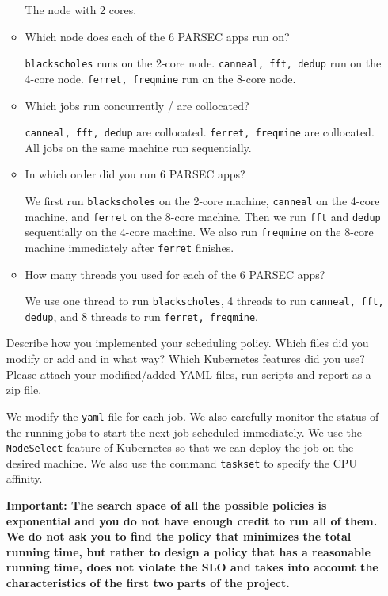 \documentclass[11pt]{article}
\begin{document}
\begin{enumerate}
\begin{itemize}
        The node with 2 cores.
        
        \item	Which node does each of the 6 PARSEC apps run on?
        
        \texttt{blackscholes} runs on the 2-core node. \texttt{canneal, fft, dedup} run on the 4-core node.
        \texttt{ferret, freqmine} run on the 8-core node.
        \item	Which jobs run concurrently / are collocated?
        
        \texttt{canneal, fft, dedup} are collocated. \texttt{ferret, freqmine} are collocated. All jobs on the same machine run sequentially.
        \item	In which order did you run 6 PARSEC apps?
        
        We first run \texttt{blackscholes} on the 2-core machine, \texttt{canneal} on the 4-core machine, and \texttt{ferret} on the 8-core machine.
        Then we run \texttt{fft} and \texttt{dedup} sequentially on the 4-core machine. We also run \texttt{freqmine} on the 8-core machine immediately after \texttt{ferret} finishes. 
        \item	How many threads you used for each of the 6 PARSEC apps? 
        
        We use one thread to run \texttt{blackscholes}, 4 threads to run \texttt{canneal, fft, dedup}, and 8 threads to run \texttt{ferret, freqmine}.
    \end{itemize}
    Describe how you implemented your scheduling policy. Which files did you modify or add and in what way? Which Kubernetes features did you use? Please attach your modified/added YAML files, run scripts and report as a zip file.
    
    We modify the \texttt{yaml} file for each job. We also carefully monitor the status of the running jobs
    to start the next job
    scheduled  immediately. We use the \texttt{NodeSelect} feature of Kubernetes so that we can deploy the job on the desired machine.
    We also use the command \texttt{taskset} to specify the CPU affinity.
    
    \textbf{Important: The search space of all the possible policies is exponential and you do not have enough credit to run all of them. We do not ask you to find the policy that minimizes
    the total running time, but rather to design a policy that has a reasonable running time, does not violate the SLO and takes into account the characteristics of the first two parts of the project.}
\end{enumerate}
\end{document}
